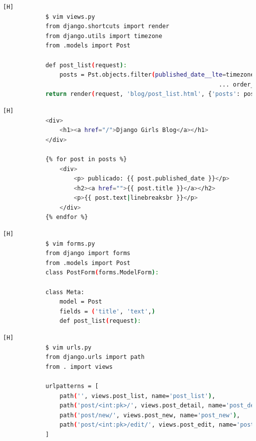 \documentclass{article}
\begin{document}
        \begin{lstlisting}[language=bash,caption={Abrimos views.py}][H]        
            $ vim views.py
            from django.shortcuts import render
            from django.utils import timezone
            from .models import Post

            def post_list(request):
                posts = Pst.objects.filter(published_date__lte=timezone.now()).  ...
                                                             ... order_by('published_date')
            return render(request, 'blog/post_list.html', {'posts': posts})
	\end{lstlisting}
 

        \begin{lstlisting}[language=bash,caption={Abrimos post-list.html}][H] 
            <div>
                <h1><a href="/">Django Girls Blog</a></h1>
            </div>
            
            {% for post in posts %}
                <div>
                    <p> publicado: {{ post.published_date }}</p>
                    <h2><a href="">{{ post.title }}</a></h2>
                    <p>{{ post.text|linebreaksbr }}</p>
                </div>
            {% endfor %}
        \end{lstlisting}

        

        
        
        

        

        \begin{lstlisting}[language=bash,caption={Creamos forms.py}][H]        
            $ vim forms.py
            from django import forms
            from .models import Post
            class PostForm(forms.ModelForm):
    
            class Meta:
                model = Post
                fields = ('title', 'text',)
                def post_list(request):
	\end{lstlisting}

        \begin{lstlisting}[language=bash,caption={Creamos urls.py}][H]        
            $ vim urls.py
            from django.urls import path
            from . import views
    
            urlpatterns = [
                path('', views.post_list, name='post_list'),
                path('post/<int:pk>/', views.post_detail, name='post_detail'),
                path('post/new/', views.post_new, name='post_new'),
                path('post/<int:pk>/edit/', views.post_edit, name='post_edit'),
            ]
	\end{lstlisting}
\end{document}
